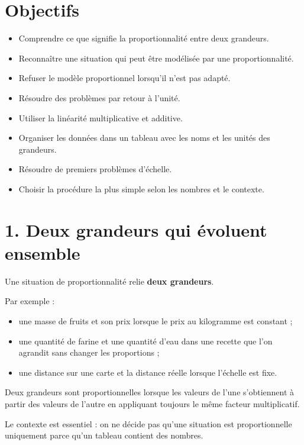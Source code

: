 
\section{Objectifs}

\begin{itemize}
\item Comprendre ce que signifie la proportionnalité entre deux grandeurs.
\item Reconnaître une situation qui peut être modélisée par une proportionnalité.
\item Refuser le modèle proportionnel lorsqu'il n'est pas adapté.
\item Résoudre des problèmes par retour à l'unité.
\item Utiliser la linéarité multiplicative et additive.
\item Organiser les données dans un tableau avec les noms et les unités des grandeurs.
\item Résoudre de premiers problèmes d'échelle.
\item Choisir la procédure la plus simple selon les nombres et le contexte.
\end{itemize}

\section{1. Deux grandeurs qui évoluent ensemble}

Une situation de proportionnalité relie \textbf{deux grandeurs}.

Par exemple :
\begin{itemize}
\item une masse de fruits et son prix lorsque le prix au kilogramme est constant ;
\item une quantité de farine et une quantité d'eau dans une recette que l'on agrandit sans changer les proportions ;
\item une distance sur une carte et la distance réelle lorsque l'échelle est fixe.
\end{itemize}

\begin{definition}
Deux grandeurs sont proportionnelles lorsque les valeurs de l'une s'obtiennent à partir des valeurs de l'autre en appliquant toujours le même facteur multiplicatif.
\end{definition}

Le contexte est essentiel : on ne décide pas qu'une situation est proportionnelle uniquement parce qu'un tableau contient des nombres.

